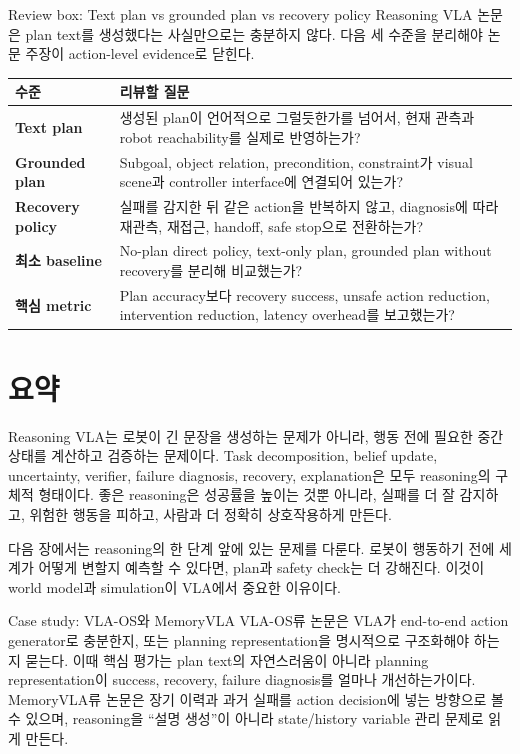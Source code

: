 \begin{casebox}{Review box: Text plan vs grounded plan vs recovery policy}
Reasoning VLA 논문은 plan text를 생성했다는 사실만으로는 충분하지 않다. 다음 세 수준을 분리해야 논문 주장이 action-level evidence로 닫힌다.

\vspace{0.5em}
\begin{tabularx}{\linewidth}{>{\bfseries}p{31mm}X}
  \toprule
  수준 & 리뷰할 질문 \\
  \midrule
  Text plan & 생성된 plan이 언어적으로 그럴듯한가를 넘어서, 현재 관측과 robot reachability를 실제로 반영하는가? \\
  Grounded plan & Subgoal, object relation, precondition, constraint가 visual scene과 controller interface에 연결되어 있는가? \\
  Recovery policy & 실패를 감지한 뒤 같은 action을 반복하지 않고, diagnosis에 따라 재관측, 재접근, handoff, safe stop으로 전환하는가? \\
  최소 baseline & No-plan direct policy, text-only plan, grounded plan without recovery를 분리해 비교했는가? \\
  핵심 metric & Plan accuracy보다 recovery success, unsafe action reduction, intervention reduction, latency overhead를 보고했는가? \\
  \bottomrule
\end{tabularx}
\end{casebox}

\section{요약}

Reasoning VLA는 로봇이 긴 문장을 생성하는 문제가 아니라, 행동 전에 필요한 중간 상태를 계산하고 검증하는 문제이다. Task decomposition, belief update, uncertainty, verifier, failure diagnosis, recovery, explanation은 모두 reasoning의 구체적 형태이다. 좋은 reasoning은 성공률을 높이는 것뿐 아니라, 실패를 더 잘 감지하고, 위험한 행동을 피하고, 사람과 더 정확히 상호작용하게 만든다.

다음 장에서는 reasoning의 한 단계 앞에 있는 문제를 다룬다. 로봇이 행동하기 전에 세계가 어떻게 변할지 예측할 수 있다면, plan과 safety check는 더 강해진다. 이것이 world model과 simulation이 VLA에서 중요한 이유이다.

\begin{casebox}{Case study: VLA-OS와 MemoryVLA}
VLA-OS류 논문은 VLA가 end-to-end action generator로 충분한지, 또는 planning representation을 명시적으로 구조화해야 하는지 묻는다. 이때 핵심 평가는 plan text의 자연스러움이 아니라 planning representation이 success, recovery, failure diagnosis를 얼마나 개선하는가이다. MemoryVLA류 논문은 장기 이력과 과거 실패를 action decision에 넣는 방향으로 볼 수 있으며, reasoning을 ``설명 생성''이 아니라 state/history variable 관리 문제로 읽게 만든다.
\end{casebox}


